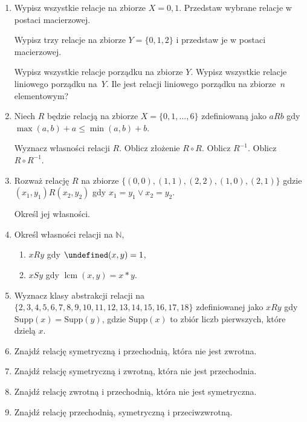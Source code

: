\documentclass[12pt]{article}
\let\gcd\undefined
\DeclareMathOperator{\gcd}{gcd}
\DeclareMathOperator{\lcm}{lcm}
\newcommand{\bN}{\mathbb{N}}
\begin{document}
\begin{enumerate}
	\item Wypisz wszystkie relacje na zbiorze $X={0,1}$.
	Przedstaw wybrane relacje w postaci macierzowej.
	
	Wypisz trzy relacje na zbiorze $Y=\{0,1,2\}$
	i przedstaw je w postaci macierzowej.
	
	Wypisz wszystkie relacje porządku na zbiorze $Y$.
	Wypisz wszystkie relacje liniowego porządku na~$Y$.
	Ile jest relacji liniowego porządku na zbiorze~$n$ elementowym?
	
	\item 
	Niech $R$ będzie relacją na zbiorze $X=\{0,1,\dots, 6\}$
	zdefiniowaną jako $aRb$ gdy $\max(a,b)+a \leq \min(a,b)+b$.
	
	Wyznacz własności relacji $R$.
	Oblicz złożenie $R\circ R$. Oblicz $R^{-1}$. 
	Oblicz $R\circ R^{-1}$.
	
	\item 
	Rozważ relację $R$ na zbiorze $\{(0,0), (1,1), (2,2), (1,0), (2,1)\}$
	gdzie $(x_1,y_1)R(x_2,y_2)$ gdy $x_1=y_1\lor x_2=y_2$.
	
	Określ jej własności.
	
	\item 
	Określ własności relacji na $\bN$, 
	\begin{enumerate}
		\item $xRy$ gdy $\gcd(x,y)=1$,
		\item $xSy$ gdy $\lcm(x,y)=x*y$.
	\end{enumerate}
	
	\item 
	Wyznacz klasy abstrakcji relacji na $\{2,3,4,5,6,7,8,9,10, 11, 12, 13, 14, 15, 16, 17,18\}$
	zdefiniowanej jako $xRy$ gdy $\mathrm{Supp}(x)=\mathrm{Supp}(y)$,
	gdzie $\mathrm{Supp}(x)$ to zbiór liczb pierwszych, które dzielą $x$.
	
	\item 
	Znajdź relację symetryczną i przechodnią, która nie jest zwrotna.
	
	\item Znajdź relację symetryczną i zwrotną, która nie jest przechodnia.
	
	\item Znajdź relację zwrotną i przechodnią, która nie jest symetryczna.
	
	\item Znajdź relację przechodnią, symetryczną i przeciwzwrotną.
	

\end{enumerate}
\end{document}
